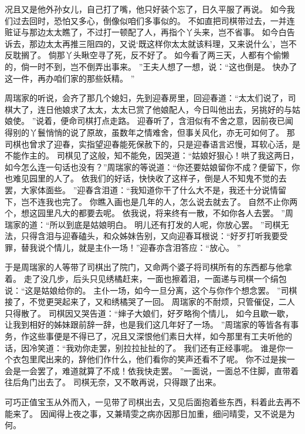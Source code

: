 况且又是他外孙女儿，自己打了嘴，他只好装个忘了，日久平服了再说。
如今我们过去回时，恐怕又多心，倒像似咱们多事似的。
不如直把司棋带过去，一并连赃证与那边太太瞧了，不过打一顿配了人，再指个丫头来，岂不省事。
如今白告诉去，那边太太再推三阻四的，又说‘既这样你太太就该料理，又来说什么’，岂不反耽搁了。
倘那丫头瞅空寻了死，反不好了。
如今看了两三天，人都有个偷懒的，倘一时不到，岂不倒弄出事来。
”王夫人想了一想，说：“这也倒是。
快办了这一件，再办咱们家的那些妖精。
”\par
周瑞家的听说，会齐了那几个媳妇，先到迎春房里，回迎春道：“太太们说了，司棋大了，连日他娘求了太太，太太已赏了他娘配人，今日叫他出去，另挑好的与姑娘使。
”说着，便命司棋打点走路。
迎春听了，含泪似有不舍之意，因前夜已闻得别的丫鬟悄悄的说了原故，虽数年之情难舍，但事关风化，亦无可如何了。
那司棋也曾求了迎春，实指望迎春能死保赦下的，只是迎春语言迟慢，耳软心活，是不能作主的。
司棋见了这般，知不能免，因哭道：“姑娘好狠心！哄了我这两日，如今怎么连一句话也没有？”周瑞家的等说道：“你还要姑娘留你不成？便留下，你也难见园里的人了。
依我们的好话，快快收了这样子，倒是人不知鬼不觉的去罢，大家体面些。
”迎春含泪道：“我知道你干了什么大不是，我还十分说情留下，岂不连我也完了。
你瞧入画也是几年的人，怎么说去就去了。
自然不止你两个，想这园里凡大的都要去呢。
依我说，将来终有一散，不如你各人去罢。
”周瑞家的道：“所以到底是姑娘明白。
明儿还有打发的人呢，你放心罢。
”司棋无法，只得含泪与迎春磕头，和众姊妹告别，又向迎春耳根说：“好歹打听我要受罪，替我说个情儿，就是主仆一场！”迎春亦含泪答应：“放心。
”\par
于是周瑞家的人等带了司棋出了院门，又命两个婆子将司棋所有的东西都与他拿着。
走了没几步，后头只见绣橘赶来，一面也擦着泪，一面递与司棋一个绢包说：“这是姑娘给你的。
主仆一场，如今一旦分离，这个与你作个想念罢。
”司棋接了，不觉更哭起来了，又和绣橘哭了一回。
周瑞家的不耐烦，只管催促，二人只得散了。
司棋因又哭告道：“婶子大娘们，好歹略徇个情儿，
如今且歇一歇，让我到相好的姊妹跟前辞一辞，也是我们这几年好了一场。
”周瑞家的等皆各有事务，作这些事便是不得已了，况且又深恨他们素日大样，如今那里有工夫听他的话，因冷笑道：“我劝你走罢，别拉拉扯扯的了。
我们还有正经事呢。
谁是你一个衣包里爬出来的，辞他们作什么，他们看你的笑声还看不了呢。
你不过是挨一会是一会罢了，难道就算了不成！依我快走罢。
”一面说，一面总不住脚，直带着往后角门出去了。
司棋无奈，又不敢再说，只得跟了出来。
\par
可巧正值宝玉从外而入，一见带了司棋出去，又见后面抱着些东西，料着此去再不能来了。
 因闻得上夜之事，又兼晴雯之病亦因那日加重，细问晴雯，又不说是为何。
